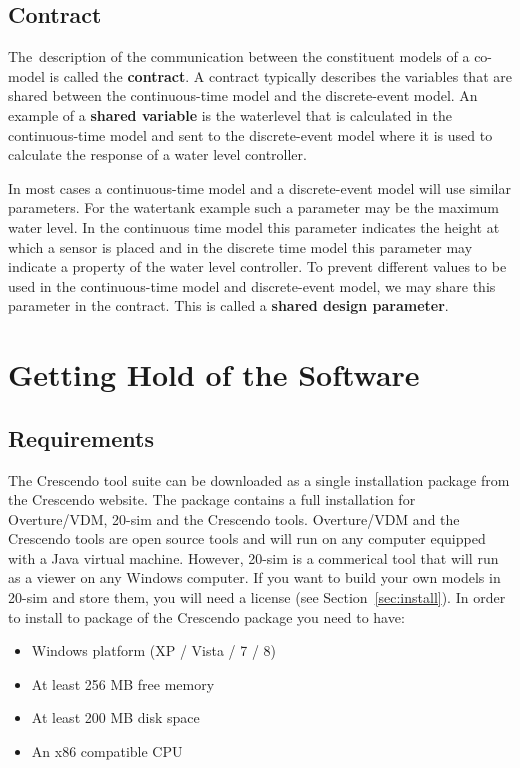 \documentclass{crescendorepchap}
\begin{document}
\section{Contract}

The~description of the communication between the constituent models of a
co-model is called the \textbf{contract}. A contract typically describes
the variables that are shared between the continuous-time model and the
discrete-event model. An example of a \textbf{shared variable} is the
waterlevel that is calculated in the continuous-time model and sent to
the discrete-event model where it is used to calculate the response of a
water level controller.

In most cases a continuous-time model and a discrete-event model will
use similar parameters. For the watertank example such a parameter may
be the maximum water level. In the continuous time model this parameter
indicates the height at which a sensor is placed and in the discrete
time model this parameter may indicate a property of the water level
controller. To prevent different values to be used in the
continuous-time model and discrete-event model, we may share this
parameter in the contract. This is called a \textbf{shared design
parameter}.

\chapter{Getting Hold of the Software}\label{chap:getting}

\section{Requirements}

The Crescendo tool suite can be downloaded as a single installation
package from the Crescendo website. The package contains a
full installation for Overture/VDM, 20-sim and the
Crescendo tools. Overture/VDM and the Crescendo tools are open source tools and
will run on any computer equipped with a Java virtual machine. However, 20-sim is a
commerical tool that will run as a viewer on any Windows computer. If you want to build your own models in 20-sim
and store them, you will need a license (see Section~\ref{sec:install}). In order to install to package of the Crescendo package you need to have:

\begin{itemize}
\item
  Windows platform (XP / Vista / 7 / 8)
\item At least
  256 MB free memory
\item At least
  200 MB disk space
\item An
  x86 compatible CPU
\end{itemize}
\end{document}
